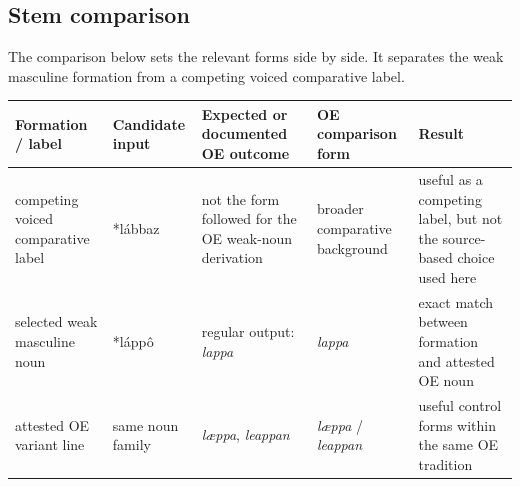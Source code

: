 \documentclass[
  british,
  a4paper,
  openany]{book}
\newcounter{none} %
\begin{document}
\subsection{Stem comparison}\label{stem-comparison-2}

The comparison below sets the relevant forms side by side. It separates
the weak masculine formation from a competing voiced comparative label.

{\def\LTcaptype{none} %
\begin{longtable}[]{@{}
  >{\raggedright\arraybackslash}p{}
  >{\raggedright\arraybackslash}p{}
  >{\raggedright\arraybackslash}p{}
  >{\raggedright\arraybackslash}p{}
  >{\raggedright\arraybackslash}p{}@{}}
\toprule\noalign{}
\begin{minipage}[b]{\linewidth}\raggedright
Formation / label
\end{minipage} & \begin{minipage}[b]{\linewidth}\raggedright
Candidate input
\end{minipage} & \begin{minipage}[b]{\linewidth}\raggedright
Expected or documented OE outcome
\end{minipage} & \begin{minipage}[b]{\linewidth}\raggedright
OE comparison form
\end{minipage} & \begin{minipage}[b]{\linewidth}\raggedright
Result
\end{minipage} \\
\midrule\noalign{}
\endhead
\bottomrule\noalign{}
\endlastfoot
competing voiced comparative label & *lábbaz & not the form followed for
the OE weak-noun derivation & broader comparative background & useful as
a competing label, but not the source-based choice used here \\
selected weak masculine noun & *láppô & regular output: \emph{lappa} &
\emph{lappa} & exact match between formation and attested OE noun \\
attested OE variant line & same noun family & \emph{læppa},
\emph{leappan} & \emph{læppa} / \emph{leappan} & useful control forms
within the same OE tradition \\
\end{longtable}
}
\end{document}
